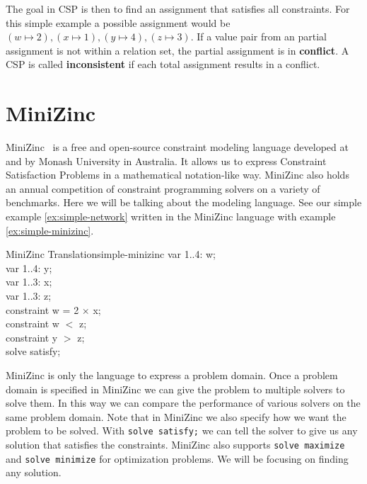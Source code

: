 The goal in CSP is then to find an assignment that satisfies all constraints. For this simple example a possible assignment would be $(w \mapsto 2), (x \mapsto 1), (y \mapsto 4), (z \mapsto 3)$. If a value pair from an partial assignment is not within a relation set, the partial assignment is in \textbf{conflict}. A CSP is called \textbf{inconsistent} if each total assignment results in a conflict.

\section{MiniZinc}

MiniZinc~\cite{minizinc:2007} is a free and open-source constraint modeling language developed at and by Monash University in Australia. It allows us to express Constraint Satisfaction Problems in a mathematical notation-like way. MiniZinc also holds an annual competition of constraint programming solvers on a variety of benchmarks. Here we will be talking about the modeling language. See our simple example \ref{ex:simple-network} written in the MiniZinc language with example \ref{ex:simple-minizinc}.

\begin{example}{MiniZinc Translation}{simple-minizinc}
	var 1..4: w; \\
	var 1..4: y; \\
	var 1..3: x; \\
	var 1..3: z; \\

	constraint w = 2 $\times$ x; \\
	constraint w $<$ z; \\
	constraint y $>$ z; \\

	solve satisfy;
\end{example}

MiniZinc is only the language to express a problem domain. Once a problem domain is specified in MiniZinc we can give the problem to multiple solvers to solve them. In this way we can compare the performance of various solvers on the same problem domain. Note that in MiniZinc we also specify how we want the problem to be solved. With \verb|solve satisfy;| we can tell the solver to give us any solution that satisfies the constraints. MiniZinc also supports \verb|solve maximize| and \verb|solve minimize| for optimization problems. We will be focusing on finding any solution.

